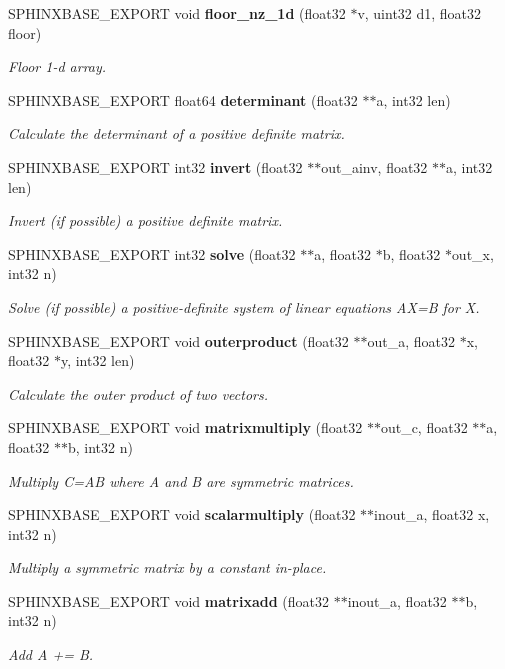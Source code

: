 \begin{DoxyCompactItemize}
S\-P\-H\-I\-N\-X\-B\-A\-S\-E\-\_\-\-E\-X\-P\-O\-R\-T void {\bf floor\-\_\-nz\-\_\-1d} (float32 $\ast$v, uint32 d1, float32 floor)
\begin{DoxyCompactList}\small\item\em Floor 1-\/d array. \end{DoxyCompactList}\item 
S\-P\-H\-I\-N\-X\-B\-A\-S\-E\-\_\-\-E\-X\-P\-O\-R\-T float64 {\bf determinant} (float32 $\ast$$\ast$a, int32 len)
\begin{DoxyCompactList}\small\item\em Calculate the determinant of a positive definite matrix. \end{DoxyCompactList}\item 
S\-P\-H\-I\-N\-X\-B\-A\-S\-E\-\_\-\-E\-X\-P\-O\-R\-T int32 {\bf invert} (float32 $\ast$$\ast$out\-\_\-ainv, float32 $\ast$$\ast$a, int32 len)
\begin{DoxyCompactList}\small\item\em Invert (if possible) a positive definite matrix. \end{DoxyCompactList}\item 
S\-P\-H\-I\-N\-X\-B\-A\-S\-E\-\_\-\-E\-X\-P\-O\-R\-T int32 {\bf solve} (float32 $\ast$$\ast$a, float32 $\ast$b, float32 $\ast$out\-\_\-x, int32 n)
\begin{DoxyCompactList}\small\item\em Solve (if possible) a positive-\/definite system of linear equations A\-X=B for X. \end{DoxyCompactList}\item 
S\-P\-H\-I\-N\-X\-B\-A\-S\-E\-\_\-\-E\-X\-P\-O\-R\-T void {\bf outerproduct} (float32 $\ast$$\ast$out\-\_\-a, float32 $\ast$x, float32 $\ast$y, int32 len)
\begin{DoxyCompactList}\small\item\em Calculate the outer product of two vectors. \end{DoxyCompactList}\item 
S\-P\-H\-I\-N\-X\-B\-A\-S\-E\-\_\-\-E\-X\-P\-O\-R\-T void {\bf matrixmultiply} (float32 $\ast$$\ast$out\-\_\-c, float32 $\ast$$\ast$a, float32 $\ast$$\ast$b, int32 n)
\begin{DoxyCompactList}\small\item\em Multiply C=A\-B where A and B are symmetric matrices. \end{DoxyCompactList}\item 
S\-P\-H\-I\-N\-X\-B\-A\-S\-E\-\_\-\-E\-X\-P\-O\-R\-T void {\bf scalarmultiply} (float32 $\ast$$\ast$inout\-\_\-a, float32 x, int32 n)
\begin{DoxyCompactList}\small\item\em Multiply a symmetric matrix by a constant in-\/place. \end{DoxyCompactList}\item 
S\-P\-H\-I\-N\-X\-B\-A\-S\-E\-\_\-\-E\-X\-P\-O\-R\-T void {\bf matrixadd} (float32 $\ast$$\ast$inout\-\_\-a, float32 $\ast$$\ast$b, int32 n)
\begin{DoxyCompactList}\small\item\em Add A += B. \end{DoxyCompactList}\end{DoxyCompactItemize}


